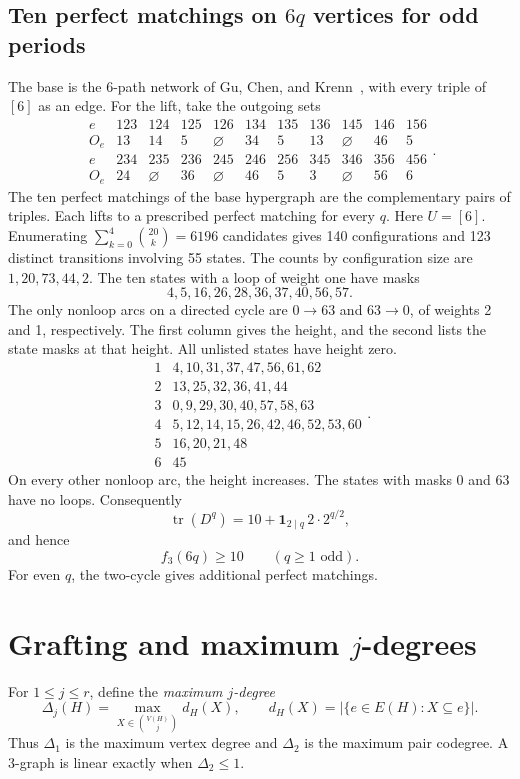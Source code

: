 \documentclass[10pt]{article}
\numberwithin{equation}{section}
\begin{document}
\subsection{Ten perfect matchings on \texorpdfstring{$6q$}{6q} vertices for odd periods}\label{finite:subsec:ten-period}
The base is the 6-path network of Gu, Chen, and Krenn~\cite[Fig.~8]{GuChenKrenn2020}, with every triple of $[6]$ as an edge. For the lift, take the outgoing sets
\[
\begin{array}{c|cccccccccc}
e&123&124&125&126&134&135&136&145&146&156\\\hline
O_e&13&14&5&\varnothing&34&5&13&\varnothing&46&5\\[3pt]
e&234&235&236&245&246&256&345&346&356&456\\\hline
O_e&24&\varnothing&36&\varnothing&46&5&3&\varnothing&56&6
\end{array}.
\]
The ten perfect matchings of the base hypergraph are the complementary pairs of triples. Each lifts to a prescribed perfect matching for every $q$. Here $U=[6]$. Enumerating $\sum_{k=0}^{4}\binom{20}{k}=6196$ candidates gives 140 configurations and 123 distinct transitions involving 55 states. The counts by configuration size are $1,20,73,44,2$. The ten states with a loop of weight one have masks
\[
 4,5,16,26,28,36,37,40,56,57.
\]
The only nonloop arcs on a directed cycle are $0\to63$ and $63\to0$, of weights 2 and 1, respectively. The first column gives the height, and the second lists the state masks at that height. All unlisted states have height zero.
\[
\begin{array}{c|l}
1&4,10,31,37,47,56,61,62\\
2&13,25,32,36,41,44\\
3&0,9,29,30,40,57,58,63\\
4&5,12,14,15,26,42,46,52,53,60\\
5&16,20,21,48\\
6&45
\end{array}.
\]
On every other nonloop arc, the height increases. The states with masks 0 and 63 have no loops. Consequently
\[
 \operatorname{tr}(D^q)=10+\mathbf1_{2\mid q}\,2\cdot2^{q/2},
\]
and hence
\begin{equation}\label{finite:eq:ten-period}
 f_3(6q)\ge10\qquad(q\ge1\text{ odd}).
\end{equation}
For even $q$, the two-cycle gives additional perfect matchings.

\section{Grafting and maximum \texorpdfstring{$j$}{j}-degrees}\label{finite:sec:grafting}
For $1\le j\le r$, define the \emph{maximum $j$-degree}
\[
 \Delta_j(H)=\max_{X\in\binom{V(H)}j}d_H(X),\qquad
 d_H(X)=|\{e\in E(H):X\subseteq e\}|.
\]
Thus $\Delta_1$ is the maximum vertex degree and $\Delta_2$ is the maximum pair codegree. A $3$-graph is linear exactly when $\Delta_2\le1$.
\end{document}
